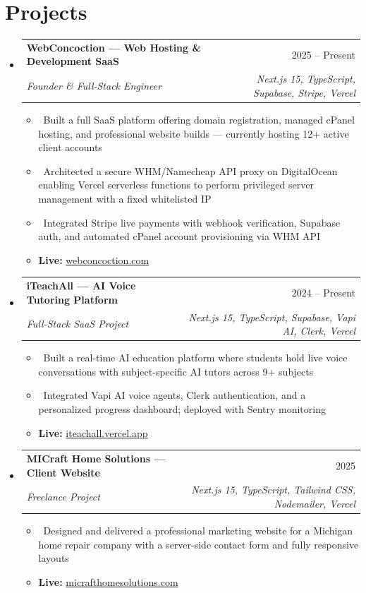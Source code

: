 \documentclass[letterpaper,10pt]{article}
\makeatletter
\newcommand{\resumeItem}[1]{\item \small{#1}}
\newcommand{\resumeSubheading}[4]{
\vspace{-2pt}\item
  \begin{tabular*}{0.97\textwidth}[t]{l@{\extracolsep{\fill}}r}
    \textbf{#1} & \small #2 \\
    \textit{\small #3} & \textit{\small #4} \\
  \end{tabular*}\vspace{-6pt}
}
\newcommand{\resumeSubHeadingList}{\begin{itemize}[leftmargin=0.15in, label={}, itemsep=-2pt]}
\newcommand{\resumeSubHeadingListEnd}{\end{itemize}}
\makeatother
\begin{document}
\section{Projects}
\resumeSubHeadingList

  \resumeSubheading
    {WebConcoction — Web Hosting \& Development SaaS}{2025 -- Present}
    {Founder \& Full-Stack Engineer}{Next.js 15, TypeScript, Supabase, Stripe, Vercel}
    \resumeSubHeadingList
      \resumeItem{\textbullet\ Built a full SaaS platform offering domain registration, managed cPanel hosting, and professional website builds — currently hosting 12+ active client accounts}
      \resumeItem{\textbullet\ Architected a secure WHM/Namecheap API proxy on DigitalOcean enabling Vercel serverless functions to perform privileged server management with a fixed whitelisted IP}
      \resumeItem{\textbullet\ Integrated Stripe live payments with webhook verification, Supabase auth, and automated cPanel account provisioning via WHM API}
      \resumeItem{\textbf{Live:} \href{https://webconcoction.com}{webconcoction.com}}
    \resumeSubHeadingListEnd

  \resumeSubheading
    {iTeachAll — AI Voice Tutoring Platform}{2024 -- Present}
    {Full-Stack SaaS Project}{Next.js 15, TypeScript, Supabase, Vapi AI, Clerk, Vercel}
    \resumeSubHeadingList
      \resumeItem{\textbullet\ Built a real-time AI education platform where students hold live voice conversations with subject-specific AI tutors across 9+ subjects}
      \resumeItem{\textbullet\ Integrated Vapi AI voice agents, Clerk authentication, and a personalized progress dashboard; deployed with Sentry monitoring}
      \resumeItem{\textbf{Live:} \href{https://iteachall.vercel.app}{iteachall.vercel.app}}
    \resumeSubHeadingListEnd

  \resumeSubheading
    {MICraft Home Solutions — Client Website}{2025}
    {Freelance Project}{Next.js 15, TypeScript, Tailwind CSS, Nodemailer, Vercel}
    \resumeSubHeadingList
      \resumeItem{\textbullet\ Designed and delivered a professional marketing website for a Michigan home repair company with a server-side contact form and fully responsive layouts}
      \resumeItem{\textbf{Live:} \href{https://www.micrafthomesolutions.com}{micrafthomesolutions.com}}
    \resumeSubHeadingListEnd

\resumeSubHeadingListEnd

\vspace{-2pt}

\end{document}
